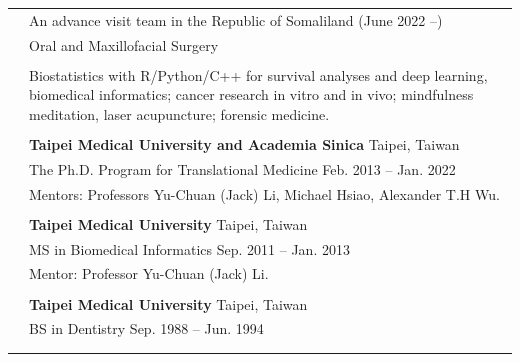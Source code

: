 \documentclass[letterpaper, 11pt]{article}
\begin{document}

\setlength{\tabcolsep}{8pt}

\begin{longtable}{p{1.3in}p{4.8in}}

\nohyphens{\color{OliveGreen}{Speciality}}
& An advance visit team in the Republic of Somaliland \hfill (June 2022 --) \\
& Oral and Maxillofacial Surgery 
\\
& \\


\nohyphens{\color{OliveGreen}{Research interests}}
& Biostatistics with R/Python/C++ for survival analyses and deep learning, biomedical informatics; cancer research in vitro and in vivo; mindfulness meditation, laser acupuncture; forensic medicine. \\
& \\


\color{OliveGreen}{Education} 
& \textbf{Taipei Medical University and Academia Sinica} \hfill Taipei, Taiwan \\ 
& The Ph.D. Program for Translational Medicine \hfill Feb. 2013 -- Jan. 2022 \\
& Mentors: Professors Yu-Chuan (Jack) Li, Michael Hsiao, Alexander T.H Wu. \\
& \\

& \textbf{Taipei Medical University} \hfill Taipei, Taiwan \\
& MS in Biomedical Informatics \hfill Sep. 2011 -- Jan. 2013\\
& Mentor: Professor Yu-Chuan (Jack) Li.\\ %
& \\

& \textbf{Taipei Medical University} \hfill Taipei, Taiwan \\
& BS in Dentistry \hfill Sep. 1988 -- Jun. 1994 \\
& \\%
& \\


\end{longtable}
\end{document}
